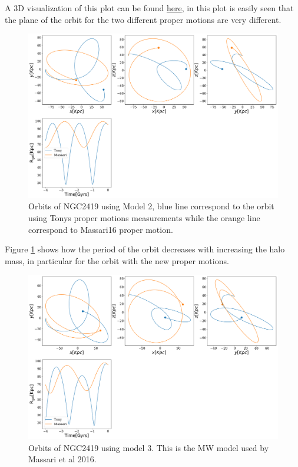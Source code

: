 \documentclass[14pt]{article}
\begin{document}
A 3D visualization of this plot can be found 
\href{https://plot.ly/~jngc/3/orbits/?share_key=FcyuVOnd0LYVXaYhGmSuo9}{here},
in this plot is easily seen that the plane of the orbit for the two
different proper motions are very different.

\begin{figure}[H]
\centering
\includegraphics[scale=0.3]{../exploratory_code/NGC2419_sphMW.pdf}
\caption{Orbits of NGC2419 using Model 2, blue line correspond to
the orbit using Tonys proper motions measurements while the orange line correspond to
Massari16 proper motion.\label{fig:model2MW}}
\end{figure}

Figure \ref{fig:model2MW} shows how the period of the orbit decreases
with increasing the halo mass, in particular for the orbit with the
new proper motions.


\begin{figure}[H]
\centering
\includegraphics[scale=0.3]{../exploratory_code/NGC2419_Triaxial_MW.pdf}
\caption{Orbits of NGC2419 using model 3. This is the MW model used by
Massari et al 2016.}
\end{figure}
\end{document}

